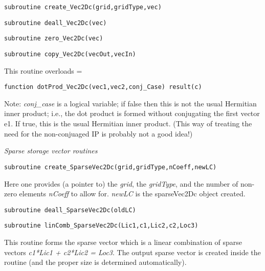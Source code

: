 \documentclass[12pt]{article}
\begin{document}
\begin{verbatim}
subroutine create_Vec2Dc(grid,gridType,vec)
\end{verbatim}

\begin{verbatim}
subroutine deall_Vec2Dc(vec)
\end{verbatim}

\begin{verbatim}
subroutine zero_Vec2Dc(vec)
\end{verbatim}

\begin{verbatim}
subroutine copy_Vec2Dc(vecOut,vecIn)
\end{verbatim}

This routine overloads =

\begin{verbatim}
function dotProd_Vec2Dc(vec1,vec2,conj_Case) result(c)
\end{verbatim}
  
Note: {\it conj\_case} is a logical variable; if false
then this is not the usual Hermitian inner product;
i.e., the dot product is formed without conjugating
the first vector e1.  If true, this is the usual Hermitian
inner product.  (This way of treating the need for
the non-conjuaged IP is probably not a good idea!)

\vspace{10pt}

\noindent
{\it Sparse storage vector routines}

\begin{verbatim}
subroutine create_SparseVec2Dc(grid,gridType,nCoeff,newLC)
\end{verbatim}

Here one provides (a pointer to) the {\it grid},
the {\it gridType}, and the number
of non-zero elements {\it nCoeff} to allow for.
{\it newLC} is the sparseVec2Dc object created.

\begin{verbatim}
subroutine deall_SparseVec2Dc(oldLC)
\end{verbatim}

\begin{verbatim}
subroutine linComb_SparseVec2Dc(Lic1,c1,Lic2,c2,Loc3)
\end{verbatim}

This routine forms the sparse vector which is a linear
combination of sparse vectors {\it c1*Lic1 + c2*Lic2 = Loc3}.
The output sparse vector is created inside the routine
(and the proper size is determined automatically). 
\end{document}
